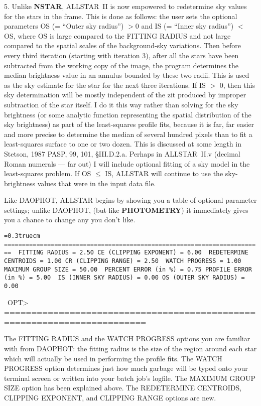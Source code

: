 \item{5.}  Unlike {\bf NSTAR}, ALLSTAR~II is now empowered to
redetermine sky values for the stars in the frame.  This is done as
follows:  the user sets the optional parameters OS (= ``Outer sky
radius'') $> 0$ and IS (= ``Inner sky radius'') $<$ OS, where OS is
large compared to the FITTING RADIUS and not large compared to the
spatial scales of the background-sky variations. Then before every
third iteration (starting with iteration 3), after all the stars have
been subtracted from the working copy of the image, the program
determines the median brightness value in an annulus bounded by these
two radii.  This is used as the sky estimate for the star for the next
three iterations.  If IS $>$ 0, then this sky determination will be
mostly independent of the zit produced by improper subtraction of the
star itself.  I do it this way rather than solving for the sky
brightness (or some analytic function representing the spatial
distribution of the sky brightness) as part of the least-squares
profile fits, because it is far, far easier and more precise to
determine the median of several hundred pixels than to fit a
least-squares surface to one or two dozen.  This is discussed at some
length in Stetson, 1987 PASP, 99, 101, \S III.D.2.a.  Perhaps in
ALLSTAR~II.v (decimal Roman numerals --- far out) I will include
optional fitting of a sky model in the least-squares problem.  If OS
$\leq$ IS, ALLSTAR will continue to use the sky-brightness values that
were in the input data file.

Like DAOPHOT, ALLSTAR begins by showing you a table of optional
parameter settings; unlike DAOPHOT, (but like {\bf PHOTOMETRY}) it
immediately gives you a chance to change any you don't like.

\bigskip
{\noindent\obeylines\obeyspaces\frenchspacing\tt\baselineskip=0.3truecm
========================================================================
\           FITTING RADIUS =  2.50       CE (CLIPPING EXPONENT) =  6.00
\    REDETERMINE CENTROIDS =  1.00          CR (CLIPPING RANGE) =  2.50
\           WATCH PROGRESS =  1.00           MAXIMUM GROUP SIZE = 50.00
\     PERCENT ERROR (in \%) =  0.75         PROFILE ERROR (in \%) =  5.00
\    IS (INNER SKY RADIUS) =  0.00        OS (OUTER SKY RADIUS) =  0.00

\ OPT> 
========================================================================
}
\bigskip

The FITTING RADIUS and the WATCH PROGRESS options you are familiar with
from DAOPHOT:  the fitting radius is the size of the region around each
star which will actually be used in performing the profile fits.  The
WATCH PROGRESS option determines just how much garbage will be typed
onto your terminal screen or written into your batch job's logfile.  The
MAXIMUM GROUP SIZE option has been explained above.  The REDETERMINE 
CENTROIDS, CLIPPING EXPONENT, and CLIPPING RANGE options are new.

